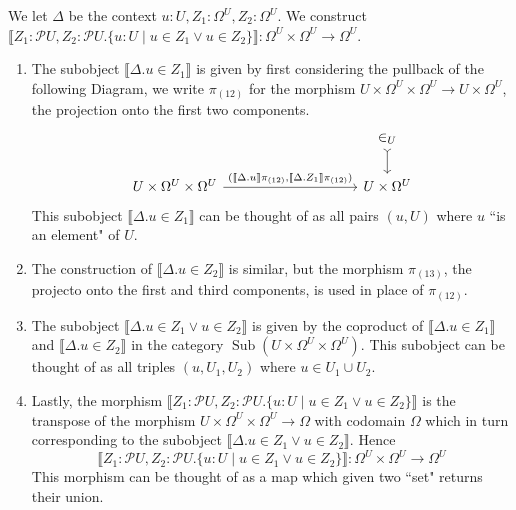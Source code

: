 \documentclass{tac}
\newcommand{\call}[1]{\mathcal{#1}}
\newcommand{\lto}{\longrightarrow}
\begin{document}
	\begin{example}\label{ex:union}
		We let $\Delta$ be the context $u:U, Z_1:\Omega^U, Z_2: \Omega^U$. We construct $\llbracket Z_1:\call{P}U, Z_2:\call{P}U. \lbrace u : U \mid u \in Z_1 \vee u \in Z_2 \rbrace \rrbracket : \Omega^U \times \Omega^U \lto \Omega^U$.
		\begin{enumerate}
			\item The subobject $\llbracket \Delta . u \in Z_1 \rrbracket$ is given by first considering the pullback of the following Diagram, we write $\pi_{(12)}$ for the morphism $U \times \Omega^U \times \Omega^U \lto U \times \Omega^U$, the projection onto the first two components.
			\begin{equation}
				\begin{tikzcd}[column sep = huge]
					& & \in_U\arrow[d, rightarrowtail]\\
					U \times \Omega^U \times \Omega^U\arrow[rr,"{(\llbracket \Delta. u\rrbracket\pi_{(12)}, \llbracket \Delta. Z_1 \rrbracket\pi_{(12)})}"] & & U \times \Omega^U
				\end{tikzcd}
			\end{equation}
			This subobject $\llbracket \Delta. u \in Z_1\rrbracket$ can be thought of as all pairs $(u, U)$ where $u$ ``is an element" of $U$.
			\item The construction of $\llbracket \Delta. u \in Z_2\rrbracket$ is similar, but the morphism $\pi_{(13)}$, the projecto onto the first and third components, is used in place of $\pi_{(12)}$.
			\item The subobject $\llbracket \Delta. u \in Z_1 \vee u \in Z_2\rrbracket$ is given by the coproduct of $\llbracket \Delta. u \in Z_1 \rrbracket$ and $\llbracket \Delta. u \in Z_2 \rrbracket$ in the category $\operatorname{Sub}(U \times \Omega^U \times \Omega^U)$. This subobject can be thought of as all triples $(u,U_1,U_2)$ where $u \in U_1 \cup U_2$.
			\item Lastly, the morphism $\llbracket Z_1:\call{P}U, Z_2:\call{P}U. \lbrace u:U \mid u \in Z_1 \vee u \in Z_2 \rbrace \rrbracket$ is the transpose of the morphism $U \times \Omega^U \times \Omega^U \lto \Omega$ with codomain $\Omega$ which in turn corresponding to the subobject $\llbracket \Delta. u \in Z_1 \vee u \in Z_2 \rrbracket$. Hence
			\begin{equation}
				\llbracket Z_1:\call{P}U, Z_2:\call{P}U. \lbrace u : U \mid u \in Z_1 \vee u \in Z_2 \rbrace \rrbracket : \Omega^U \times \Omega^U \lto \Omega^U
			\end{equation}
			This morphism can be thought of as a map which given two ``set" returns their union.
		\end{enumerate}
	\end{example}
\end{document}
